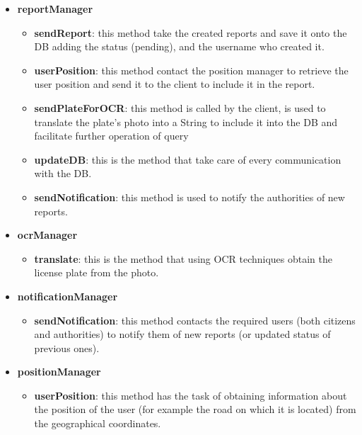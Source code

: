 \documentclass[12pt,a4paper]{report}
\begin{document}
				\begin{itemize}
					\item \textbf{reportManager}
					\begin{itemize}
						\item \textbf{sendReport}: this method take the created reports and save it onto the DB adding
						the status (pending), and the username who created it.
						\item \textbf{userPosition}: this method contact the position manager to retrieve the user
						position and send it to the client to include it in the report.
						\item \textbf{sendPlateForOCR}: this method is called by the client, is used to translate the
						plate's photo into a String to include it into the DB and facilitate further operation of query
						\item \textbf{updateDB}: this is the method that take care of every communication with the DB.
						\item \textbf{sendNotification}: this method is used to notify the authorities of new reports.
					\end{itemize}
					\item \textbf{ocrManager}
					\begin{itemize}
						\item \textbf{translate}: this is the method that using OCR techniques obtain the license plate
						from the photo.
					\end{itemize} \item \textbf{notificationManager}
					\begin{itemize}
						\item \textbf{sendNotification}: this method contacts the required users (both citizens
						and authorities) to notify them of new reports (or updated status of previous ones).
					\end{itemize}
					\item \textbf{positionManager}
					\begin{itemize}
						\item \textbf{userPosition}: this method has the task of obtaining information about the position of the
							user (for example the road on which it is located) from the geographical coordinates.
					\end{itemize}
				\end{itemize}
\end{document}
